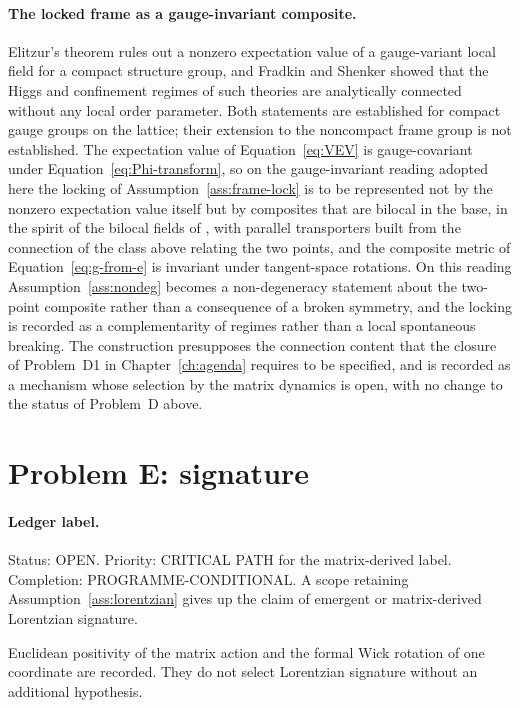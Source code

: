 \paragraph{The locked frame as a gauge-invariant composite.}
Elitzur's theorem \cite{Elitzur1975} rules out a nonzero expectation value of a gauge-variant local field for a compact structure group, and Fradkin and Shenker \cite{FradkinShenker1979} showed that the Higgs and confinement regimes of such theories are analytically connected without any local order parameter. Both statements are established for compact gauge groups on the lattice; their extension to the noncompact frame group is not established. The expectation value of Equation~\eqref{eq:VEV} is gauge-covariant under Equation~\eqref{eq:Phi-transform}, so on the gauge-invariant reading adopted here the locking of Assumption~\ref{ass:frame-lock} is to be represented not by the nonzero expectation value itself but by composites that are bilocal in the base, in the spirit of the bilocal fields of \cite{HoKawaiSteinacker2025}, with parallel transporters built from the connection of the class above relating the two points, and the composite metric of Equation~\eqref{eq:g-from-e} is invariant under tangent-space rotations. On this reading Assumption~\ref{ass:nondeg} becomes a non-degeneracy statement about the two-point composite rather than a consequence of a broken symmetry, and the locking is recorded as a complementarity of regimes rather than a local spontaneous breaking. The construction presupposes the connection content that the closure of Problem~D1 in Chapter~\ref{ch:agenda} requires to be specified, and is recorded as a mechanism whose selection by the matrix dynamics is open, with no change to the status of Problem~D above.

\section{Problem E: signature}
\label{sec:status-E}

\paragraph{Ledger label.}
Status: OPEN. Priority: CRITICAL PATH for the matrix-derived label.
Completion: PROGRAMME-CONDITIONAL. A scope retaining
Assumption~\ref{ass:lorentzian} gives up the claim of emergent or
matrix-derived Lorentzian signature.

Euclidean positivity of the matrix action and the formal Wick rotation of
one coordinate are recorded. They do not select Lorentzian signature without
an additional hypothesis.

